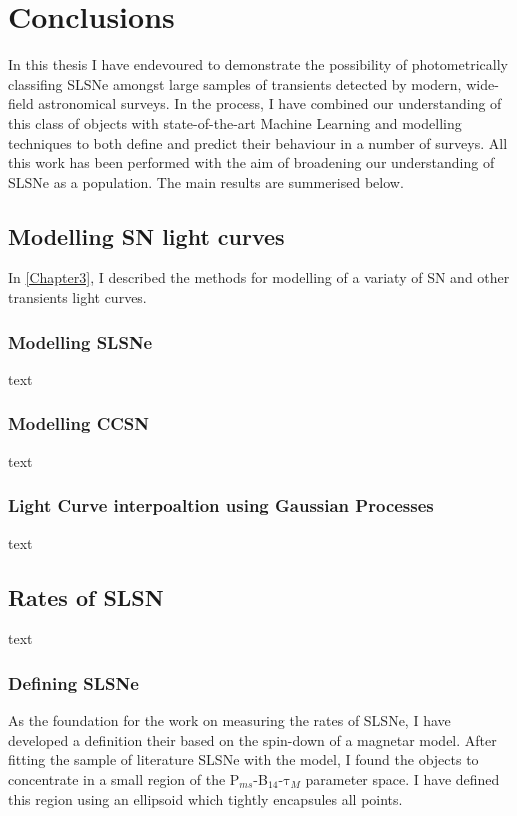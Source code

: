 \chapter{Conclusions}
\label{Chapter7}

In this thesis I have endevoured to demonstrate the possibility of photometrically classifing SLSNe amongst large samples of transients detected by modern, wide-field astronomical surveys. In the process, I have combined our understanding of this class of objects with state-of-the-art Machine Learning and modelling techniques to both define and predict their behaviour in a number of surveys. All this work has been performed with the aim of broadening our understanding of SLSNe as a population. The main results are summerised below.

\section{Modelling SN light curves}
In \cref{Chapter3}, I described the methods for modelling of a variaty of SN and other transients light curves.

\subsection{Modelling SLSNe}
text

\subsection{Modelling CCSN}
text

\subsection{Light Curve interpoaltion using Gaussian Processes}
text

\section{Rates of SLSN}
text

\subsection{Defining SLSNe}
As the foundation for the work on measuring the rates of SLSNe, I have developed a definition their based on the spin-down of a magnetar model. After fitting the sample of literature SLSNe with the model, I found the objects to concentrate in a small region of the P$_{ms}$-B$_{14}$-$\mathrm{\tau}_M$ parameter space. I have defined this region using an ellipsoid which tightly encapsules all points.

